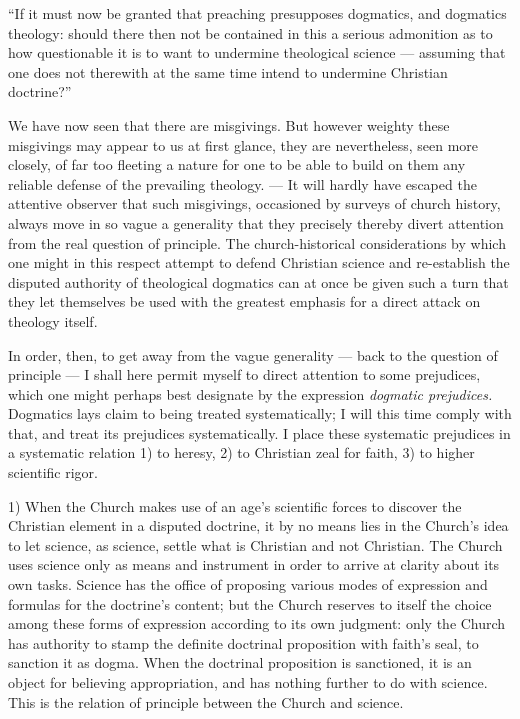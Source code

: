 \documentclass[12pt,a4paper]{book}
\begin{document}
``If it must now be granted that preaching presupposes dogmatics, and dogmatics theology: should
there then not be contained in this a serious admonition as to how questionable it is to want to
undermine theological science --- assuming that one does not therewith at the same time intend
to undermine Christian doctrine?''

We have now seen that there are misgivings. But however weighty these misgivings may appear to
us at first glance, they are nevertheless, seen more closely, of far too fleeting a nature for
one to be able to build on them any reliable defense of the prevailing theology. --- It will
hardly have escaped the attentive observer that such misgivings, occasioned by surveys of church
history, always move in so vague a generality that they precisely thereby divert attention from
the real question of principle. The church-historical considerations by which one might in this
respect attempt to defend Christian science and re-establish the disputed authority of
theological dogmatics can at once be given such a turn that they let themselves be used with the
greatest emphasis for a direct attack on theology itself.

In order, then, to get away from the vague generality --- back to the question of principle ---
I shall here permit myself to direct attention to some prejudices, which one might perhaps best
designate by the expression \emph{dogmatic prejudices.}
Dogmatics lays claim to being treated systematically; I will this time comply with that, and
treat its prejudices systematically. I place these systematic prejudices in a systematic
relation 1) to heresy, 2) to Christian zeal for faith, 3) to higher scientific rigor.

1) When the Church makes use of an age's scientific forces to discover the Christian element in
a disputed doctrine, it by no means lies in the Church's idea to let science, as science, settle
what is Christian and not Christian. The Church uses science only as means and instrument in
order to arrive at clarity about its own tasks. Science has the office of proposing various
modes of expression and formulas for the doctrine's content; but the Church reserves to itself
the choice among these forms of expression according to its own judgment: only the Church has
authority to stamp the definite doctrinal proposition with faith's seal, to sanction it as
dogma. When the doctrinal proposition is sanctioned, it is an object for believing appropriation,
and has nothing further to do with science. This is the relation of principle between the Church
and science.
\end{document}
